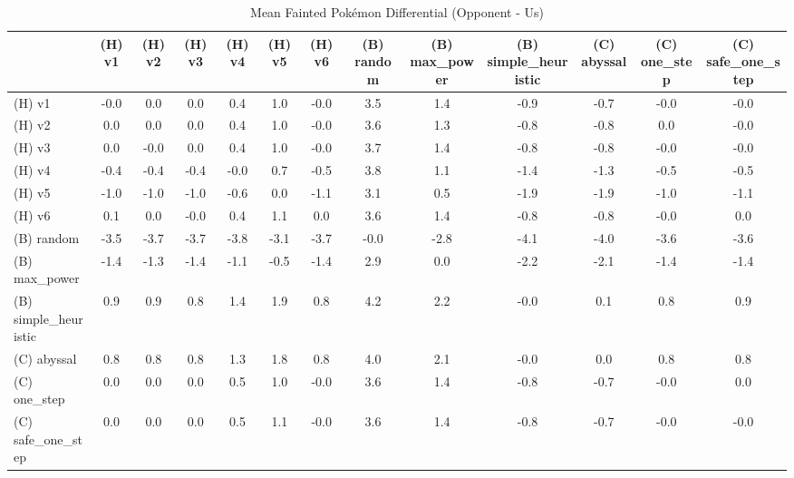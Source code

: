 \begin{table}[htbp]
\caption{Mean Fainted Pokémon Differential (Opponent - Us)}
\label{tab:fainted_diff}
\begin{tabular}{lcccccccccccc}
\hline
 & (H) v1 & (H) v2 & (H) v3 & (H) v4 & (H) v5 & (H) v6 & (B) random & (B) max\_power & (B) simple\_heuristic & (C) abyssal & (C) one\_step & (C) safe\_one\_step \\
\hline
(H) v1 & -0.0 & 0.0 & 0.0 & 0.4 & 1.0 & -0.0 & 3.5 & 1.4 & -0.9 & -0.7 & -0.0 & -0.0 \\
(H) v2 & 0.0 & 0.0 & 0.0 & 0.4 & 1.0 & -0.0 & 3.6 & 1.3 & -0.8 & -0.8 & 0.0 & -0.0 \\
(H) v3 & 0.0 & -0.0 & 0.0 & 0.4 & 1.0 & -0.0 & 3.7 & 1.4 & -0.8 & -0.8 & -0.0 & -0.0 \\
(H) v4 & -0.4 & -0.4 & -0.4 & -0.0 & 0.7 & -0.5 & 3.8 & 1.1 & -1.4 & -1.3 & -0.5 & -0.5 \\
(H) v5 & -1.0 & -1.0 & -1.0 & -0.6 & 0.0 & -1.1 & 3.1 & 0.5 & -1.9 & -1.9 & -1.0 & -1.1 \\
(H) v6 & 0.1 & 0.0 & -0.0 & 0.4 & 1.1 & 0.0 & 3.6 & 1.4 & -0.8 & -0.8 & -0.0 & 0.0 \\
(B) random & -3.5 & -3.7 & -3.7 & -3.8 & -3.1 & -3.7 & -0.0 & -2.8 & -4.1 & -4.0 & -3.6 & -3.6 \\
(B) max\_power & -1.4 & -1.3 & -1.4 & -1.1 & -0.5 & -1.4 & 2.9 & 0.0 & -2.2 & -2.1 & -1.4 & -1.4 \\
(B) simple\_heuristic & 0.9 & 0.9 & 0.8 & 1.4 & 1.9 & 0.8 & 4.2 & 2.2 & -0.0 & 0.1 & 0.8 & 0.9 \\
(C) abyssal & 0.8 & 0.8 & 0.8 & 1.3 & 1.8 & 0.8 & 4.0 & 2.1 & -0.0 & 0.0 & 0.8 & 0.8 \\
(C) one\_step & 0.0 & 0.0 & 0.0 & 0.5 & 1.0 & -0.0 & 3.6 & 1.4 & -0.8 & -0.7 & -0.0 & 0.0 \\
(C) safe\_one\_step & 0.0 & 0.0 & 0.0 & 0.5 & 1.1 & -0.0 & 3.6 & 1.4 & -0.8 & -0.7 & -0.0 & -0.0 \\
\hline
\end{tabular}
\end{table}
